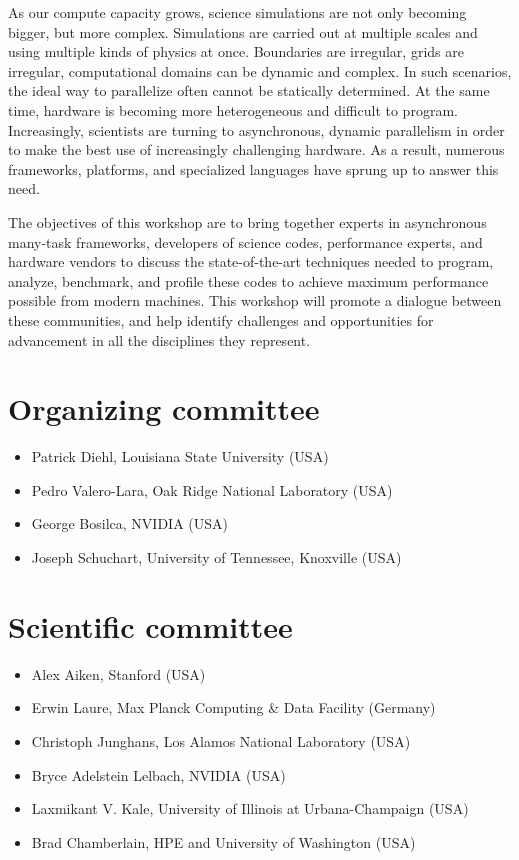 As our compute capacity grows, science simulations are not only becoming bigger, but more complex. Simulations are carried out at multiple scales and using multiple kinds of physics at once. Boundaries are irregular, grids are irregular, computational domains can be dynamic and complex. In such scenarios, the ideal way to parallelize often cannot be statically determined. At the same time, hardware is becoming more heterogeneous and difficult to program. Increasingly, scientists are turning to asynchronous, dynamic parallelism in order to make the best use of increasingly challenging hardware. As a result, numerous frameworks, platforms, and specialized languages have sprung up to answer this need.

The objectives of this workshop are to bring together experts in asynchronous many-task frameworks, developers of science codes, performance experts, and hardware vendors to discuss the state-of-the-art techniques needed to program, analyze, benchmark, and profile these codes to achieve maximum performance possible from modern machines. This workshop will promote a dialogue between these communities, and help identify challenges and opportunities for advancement in all the disciplines they represent.

\section*{Organizing committee}
\begin{itemize}
\item Patrick Diehl, Louisiana State University (USA)
\item Pedro Valero-Lara, Oak Ridge National Laboratory (USA)
\item George Bosilca, NVIDIA (USA)
\item Joseph Schuchart, University of Tennessee, Knoxville (USA)
\end{itemize}

\section*{Scientific committee}
\begin{itemize}
\item Alex Aiken, Stanford (USA)
\item Erwin Laure, Max Planck Computing \& Data Facility (Germany)
\item Christoph Junghans, Los Alamos National Laboratory (USA)
\item Bryce Adelstein Lelbach, NVIDIA (USA)
\item  Laxmikant V. Kale, University of Illinois at Urbana-Champaign (USA)
\item Brad Chamberlain, HPE and University of Washington (USA)
\end{itemize}

